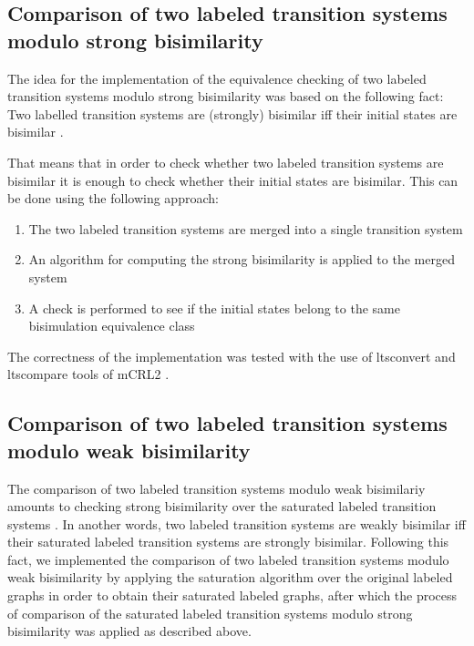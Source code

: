 \subsection{Comparison of two labeled transition systems modulo strong bisimilarity}
The idea for the implementation of the equivalence checking of two labeled transition systems modulo strong bisimilarity was based on the following fact: Two labelled transition systems are (strongly) bisimilar iff their initial states are bisimilar \cite{ModellingAndAnalysis}.

That means that in order to check whether two labeled transition systems are bisimilar it is enough to check whether their initial states are bisimilar. This can be done using the following approach:
\begin{enumerate}
	\item The two labeled transition systems are merged into a single transition system
	\item An algorithm for computing the strong bisimilarity is applied to the merged system
	\item A check is performed to see if the initial states belong to the same bisimulation equivalence class
\end{enumerate}

The correctness of the implementation was tested with the use of ltsconvert and ltscompare tools of mCRL2 \cite{mCRL2}.

\subsection{Comparison of two labeled transition systems modulo weak bisimilarity}
The comparison of two labeled transition systems modulo weak bisimilariy amounts to checking strong bisimilarity over the saturated labeled transition systems \cite{ReactiveSystems}. In another words, two labeled transition systems are weakly bisimilar iff their saturated labeled transition systems are strongly bisimilar. Following this fact, we implemented the comparison of two labeled transition systems modulo weak bisimilarity by applying the saturation algorithm over the original labeled graphs in order to obtain their saturated labeled graphs, after which the process of comparison of the saturated labeled transition systems modulo strong bisimilarity was applied as described above.